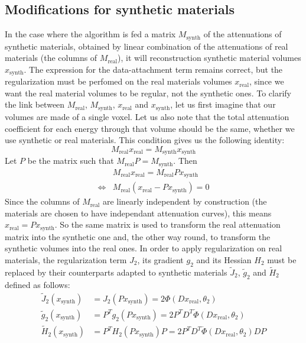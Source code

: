 \documentclass[a4paper, 10pt]{article}
\begin{document}
\subsection{Modifications for synthetic materials}
\label{sec:modifs}
In the case where the algorithm is fed a matrix $M_{\text{synth}}$ of the attenuations of synthetic materials, obtained by linear combination of the attenuations of real materials (the columns of $M_{\text{real}}$), 
it will reconstruction synthetic material volumes $x_{\text{synth}}$. The expression for the data-attachment term remains correct, but the regularization must be perfomed on the real materials volumes $x_{\text{real}}$,
since we want the real material volumes to be regular, not the synthetic ones. To clarify the link between $M_{\text{real}}$, $M_{\text{synth}}$, $x_{\text{real}}$ and $x_{\text{synth}}$, let us first imagine that our volumes
are made of a single voxel. Let us also note that the total attenuation coefficient for each energy through that volume should be the same, whether we use synthetic or real materials. This condition gives us 
the following identity:
\begin{equation*}
 M_{\text{real}} x_{\text{real}} = M_{\text{synth}} x_{\text{synth}}
\end{equation*}
Let $P$ be the matrix such that $ M_{\text{real}} P = M_{\text{synth}}$. Then
\begin{equation*}
  \begin{split}
  & M_{\text{real}} x_{\text{real}} = M_{\text{real}} P x_{\text{synth}} \\
  \iff & M_{\text{real}} \left( x_{\text{real}} - P x_{\text{synth}} \right) = 0
  \end{split}
\end{equation*}
Since the columns of $M_{\text{real}}$ are linearly independent by construction (the materials are chosen to have independant attenuation curves), this means $x_{\text{real}} = P x_{\text{synth}}$.
So the same matrix is used to transform the real attenuation matrix into the synthetic one and, the other way round, to transform the synthetic volumes into the real ones. 
In order to apply regularization on real materials, the regularization term $J_2$, its gradient $g_2$ and its Hessian $H_2$ must be replaced by their counterparts adapted to synthetic materials 
$\widetilde{J}_2$, $\widetilde{g}_2$ and $\widetilde{H}_2$ defined as follows:
\begin{equation*}
 \begin{split}
 \widetilde{J}_2(x_{\text{synth}}) &= J_2(P x_{\text{synth}}) = 2 \Phi(Dx_{\text{real}},\theta_2) \\
 \widetilde{g}_2(x_{\text{synth}}) &= P^T g_2(P x_{\text{synth}}) = 2 P^T D^T \dot{\Phi}(Dx_{\text{real}},\theta_2) \\
 \widetilde{H}_2(x_{\text{synth}}) &= P^T H_2(P x_{\text{synth}}) P = 2 P^T D^T \ddot{\Phi}(Dx_{\text{real}},\theta_2) D P
 \end{split}
\end{equation*}
\end{document}
